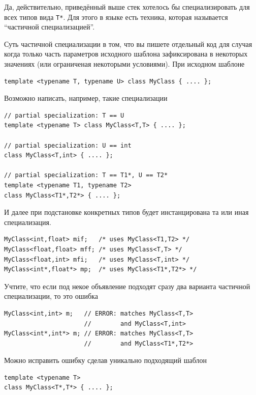 \documentclass[a4paper,12pt,oneside]{book}
\begin{document}
Да, действительно, приведённый выше стек хотелось бы специализировать для всех типов вида \lstinline!T*!. Для этого в языке есть техника, которая называется ``частичной специализацией''.

Суть частичной специализации в том, что вы пишете отдельный код для случая когда только часть параметров исходного шаблона зафиксирована в некоторых значениях (или ограниченая некоторыми условиями). При исходном шаблоне

\begin{lstlisting}
template <typename T, typename U> class MyClass { .... };
\end{lstlisting}

Возможно написать, например, такие специализации

\begin{lstlisting}
// partial specialization: T == U 
template <typename T> class MyClass<T,T> { .... }; 

// partial specialization: U == int
class MyClass<T,int> { .... }; 

// partial specialization: T == T1*, U == T2*
template <typename T1, typename T2> 
class MyClass<T1*,T2*> { .... };
\end{lstlisting}

И далее при подстановке конкретных типов будет инстанцирована та или иная специализация.

\begin{lstlisting}
MyClass<int,float> mif;   /* uses MyClass<T1,T2> */ 
MyClass<float,float> mff; /* uses MyClass<T,T> */ 
MyClass<float,int> mfi;   /* uses MyClass<T,int> */ 
MyClass<int*,float*> mp;  /* uses MyClass<T1*,T2*> */
\end{lstlisting}

Учтите, что если под некое объявление подходят сразу два варианта частичной специализации, то это ошибка

\begin{lstlisting}
MyClass<int,int> m;   // ERROR: matches MyClass<T,T> 
                      //        and MyClass<T,int> 
MyClass<int*,int*> m; // ERROR: matches MyClass<T,T> 
                      //        and MyClass<T1*,T2*>
\end{lstlisting}

Можно исправить ошибку сделав уникально подходящий шаблон

\begin{lstlisting}
template <typename T> 
class MyClass<T*,T*> { .... };
\end{lstlisting}
\end{document}
